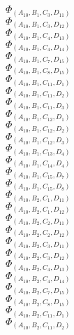 \documentclass[14pt]{article}
\begin{document}
    $\Phi_{({A}_{10}, {B}_{1}, {C}_{3}, {D}_{11})}$ \\ 
    $\Phi_{({A}_{10}, {B}_{1}, {C}_{3}, {D}_{12})}$ \\ 
    $\Phi_{({A}_{10}, {B}_{1}, {C}_{4}, {D}_{13})}$ \\ 
    $\Phi_{({A}_{10}, {B}_{1}, {C}_{4}, {D}_{14})}$ \\ 
    $\Phi_{({A}_{10}, {B}_{1}, {C}_{7}, {D}_{15})}$ \\ 
    $\Phi_{({A}_{10}, {B}_{1}, {C}_{8}, {D}_{15})}$ \\ 
    $\Phi_{({A}_{10}, {B}_{1}, {C}_{11}, {D}_{1})}$ \\ 
    $\Phi_{({A}_{10}, {B}_{1}, {C}_{11}, {D}_{2})}$ \\ 
    $\Phi_{({A}_{10}, {B}_{1}, {C}_{11}, {D}_{3})}$ \\ 
    $\Phi_{({A}_{10}, {B}_{1}, {C}_{12}, {D}_{1})}$ \\ 
    $\Phi_{({A}_{10}, {B}_{1}, {C}_{12}, {D}_{2})}$ \\ 
    $\Phi_{({A}_{10}, {B}_{1}, {C}_{12}, {D}_{3})}$ \\ 
    $\Phi_{({A}_{10}, {B}_{1}, {C}_{13}, {D}_{4})}$ \\ 
    $\Phi_{({A}_{10}, {B}_{1}, {C}_{14}, {D}_{4})}$ \\ 
    $\Phi_{({A}_{10}, {B}_{1}, {C}_{15}, {D}_{7})}$ \\ 
    $\Phi_{({A}_{10}, {B}_{1}, {C}_{15}, {D}_{8})}$ \\ 
    $\Phi_{({A}_{10}, {B}_{2}, {C}_{1}, {D}_{11})}$ \\ 
    $\Phi_{({A}_{10}, {B}_{2}, {C}_{1}, {D}_{12})}$ \\ 
    $\Phi_{({A}_{10}, {B}_{2}, {C}_{2}, {D}_{11})}$ \\ 
    $\Phi_{({A}_{10}, {B}_{2}, {C}_{2}, {D}_{12})}$ \\ 
    $\Phi_{({A}_{10}, {B}_{2}, {C}_{3}, {D}_{11})}$ \\ 
    $\Phi_{({A}_{10}, {B}_{2}, {C}_{3}, {D}_{12})}$ \\ 
    $\Phi_{({A}_{10}, {B}_{2}, {C}_{4}, {D}_{13})}$ \\ 
    $\Phi_{({A}_{10}, {B}_{2}, {C}_{4}, {D}_{14})}$ \\ 
    $\Phi_{({A}_{10}, {B}_{2}, {C}_{7}, {D}_{15})}$ \\ 
    $\Phi_{({A}_{10}, {B}_{2}, {C}_{8}, {D}_{15})}$ \\ 
    $\Phi_{({A}_{10}, {B}_{2}, {C}_{11}, {D}_{1})}$ \\ 
    $\Phi_{({A}_{10}, {B}_{2}, {C}_{11}, {D}_{2})}$ \\ 
\end{document}
